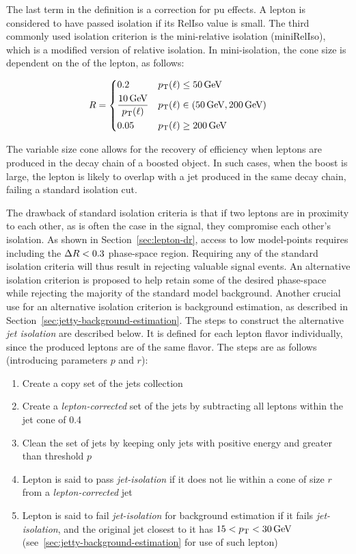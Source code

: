 The last term in the definition is a correction for \gls{pu} effects. A lepton is considered to have passed isolation if its RelIso value is small. The third commonly used isolation criterion is the mini-relative isolation (miniRelIso), which is a modified version of relative isolation. In mini-isolation, the cone size is dependent on the \pt of the lepton, as follows:

\begin{equation}
R = 
\begin{dcases}
0.2 & p_{\mathrm{T}}(\ell)\leq 50\,\text{Ge\hspace{-.08em}V} \\
\frac{10\,\text{Ge\hspace{-.08em}V}}{p_{\mathrm{T}}(\ell)} & p_{\mathrm{T}}(\ell) \in (50\,\text{Ge\hspace{-.08em}V} , 200\,\text{Ge\hspace{-.08em}V}) \\
0.05 & p_{\mathrm{T}}(\ell)\geq 200\,\text{Ge\hspace{-.08em}V}
\end{dcases}
\end{equation}

The variable size cone allows for the recovery of efficiency when leptons are produced in the decay chain of a boosted object. In such cases, when the boost is large, the lepton is likely to overlap with a jet produced in the same decay chain, failing a standard isolation cut.

The drawback of standard isolation criteria is that if two leptons are in proximity to each other, as is often the case in the signal, they compromise each other's isolation. As shown in Section~\ref{sec:lepton-dr}, access to low \dm model-points requires including the $\Delta R<0.3$ phase-space region. Requiring any of the standard isolation criteria will thus result in rejecting valuable signal events. An alternative isolation criterion is proposed to help retain some of the desired phase-space while rejecting the majority of the standard model background. Another crucial use for an alternative isolation criterion is background estimation, as described in Section~\ref{sec:jetty-background-estimation}. The steps to construct the alternative \emph{jet isolation} are described below. It is defined for each lepton flavor individually, since the produced leptons are of the same flavor. The steps are as follows (introducing parameters $p$ and $r$):

\begin{enumerate}
\item Create a copy set of the jets collection
\item Create a \emph{lepton-corrected} set of the jets by subtracting all leptons within the jet cone of 0.4
\item Clean the set of jets by keeping only jets with positive energy and \pt greater than threshold $p$
\item Lepton is said to pass \emph{jet-isolation} if it does not lie within a cone of size $r$ from a \emph{lepton-corrected} jet
\item Lepton is said to fail \emph{jet-isolation} for background estimation if it fails \emph{jet-isolation}, and the original jet closest to it has $15<p_{\mathrm{T}}<30\,\text{Ge\hspace{-.08em}V}$ (see~\ref{sec:jetty-background-estimation} for use of such lepton)
\end{enumerate}


